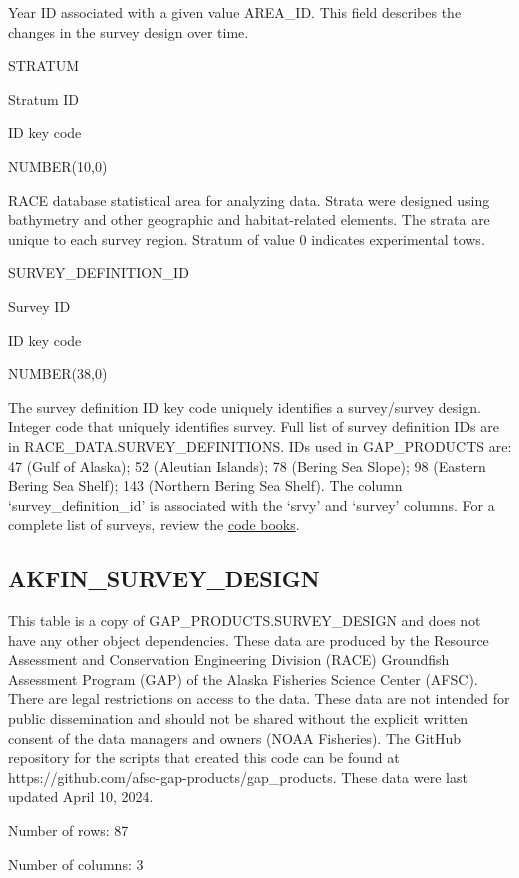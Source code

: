 \documentclass[
  letterpaper,
  oneside,
  open=any]{scrbook}
\begin{document}
Year ID associated with a given value AREA\_ID. This field describes the
changes in the survey design over time.

STRATUM

Stratum ID

ID key code

NUMBER(10,0)

RACE database statistical area for analyzing data. Strata were designed
using bathymetry and other geographic and habitat-related elements. The
strata are unique to each survey region. Stratum of value 0 indicates
experimental tows.

SURVEY\_DEFINITION\_ID

Survey ID

ID key code

NUMBER(38,0)

The survey definition ID key code uniquely identifies a survey/survey
design. Integer code that uniquely identifies survey. Full list of
survey definition IDs are in RACE\_DATA.SURVEY\_DEFINITIONS. IDs used in
GAP\_PRODUCTS are: 47 (Gulf of Alaska); 52 (Aleutian Islands); 78
(Bering Sea Slope); 98 (Eastern Bering Sea Shelf); 143 (Northern Bering
Sea Shelf). The column `survey\_definition\_id' is associated with the
`srvy' and `survey' columns. For a complete list of surveys, review the
\href{https://www.fisheries.noaa.gov/resource/document/groundfish-survey-species-code-manual-and-data-codes-manual}{code
books}.

\hypertarget{akfin_survey_design}{%
\subsection{AKFIN\_SURVEY\_DESIGN}\label{akfin_survey_design}}

This table is a copy of GAP\_PRODUCTS.SURVEY\_DESIGN and does not have
any other object dependencies. These data are produced by the Resource
Assessment and Conservation Engineering Division (RACE) Groundfish
Assessment Program (GAP) of the Alaska Fisheries Science Center (AFSC).
There are legal restrictions on access to the data. These data are not
intended for public dissemination and should not be shared without the
explicit written consent of the data managers and owners (NOAA
Fisheries). The GitHub repository for the scripts that created this code
can be found at https://github.com/afsc-gap-products/gap\_products.
These data were last updated April 10, 2024.

Number of rows: 87

Number of columns: 3
\end{document}
